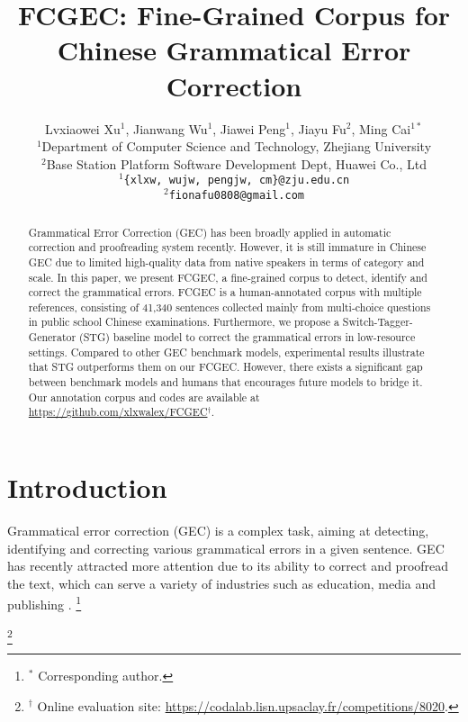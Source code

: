 \documentclass[11pt]{article}
\title{FCGEC: Fine-Grained Corpus for Chinese Grammatical Error Correction}
\author{Lvxiaowei Xu$^{1}$, Jianwang Wu$^{1}$, Jiawei Peng$^{1}$, Jiayu Fu$^{2}$, Ming Cai$^{1*}$ \\ $^{1}$Department of Computer Science and Technology, Zhejiang University \\
$^{2}$Base Station Platform Software Development Dept, Huawei Co., Ltd \\
\texttt{$^1$\{xlxw, wujw, pengjw, cm\}@zju.edu.cn} \\
\texttt{$^2$fionafu0808@gmail.com}}
\newcommand\blfootnote[1]{\begingroup
  \renewcommand\thefootnote{}\footnote{#1}\addtocounter{footnote}{-1}\endgroup
}
\begin{document}
\maketitle
\begin{abstract}
Grammatical Error Correction (GEC) has been broadly applied in automatic correction and proofreading system recently. However, it is still immature in Chinese GEC due to limited high-quality data from native speakers in terms of category and scale. In this paper, we present FCGEC, a fine-grained corpus to detect, identify and correct the grammatical errors. FCGEC is a human-annotated corpus with multiple references, consisting of 41,340 sentences collected mainly from multi-choice questions in public school Chinese examinations. Furthermore, we propose a  Switch-Tagger-Generator (STG) baseline model to correct the grammatical errors in low-resource settings. Compared to other GEC benchmark models, experimental results illustrate that STG outperforms them on our FCGEC. However, there exists a significant gap between benchmark models and humans that encourages future models to bridge it. Our annotation corpus and codes are available at \url{https://github.com/xlxwalex/FCGEC}$^{\dagger}$.
\end{abstract} 
\section{Introduction}

Grammatical error correction (GEC) is a complex task, aiming at detecting, identifying and correcting various grammatical errors in a given sentence. GEC has recently attracted more attention due to its ability to correct and proofread the text, which can serve a variety of industries such as education, media and publishing \cite{wang2021comprehensive}.\blfootnote{$^*$ Corresponding author.}\blfootnote{$^{\dagger}$ Online evaluation site: \url{https://codalab.lisn.upsaclay.fr/competitions/8020}.}
\end{document}
